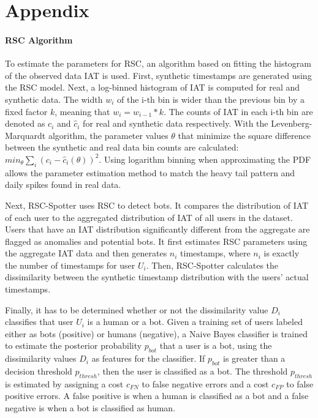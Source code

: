 \documentclass[11pt, oneside]{article}   	%
\begin{document}
\section{Appendix}
\paragraph*{RSC Algorithm}
\quad

\quad To estimate the parameters for RSC, an algorithm based on fitting the histogram of the observed data IAT is used.
First, synthetic timestamps are generated using the RSC model.
Next, a log-binned histogram of IAT is computed for real and synthetic data.
The width $w_i$ of the i-th bin is wider than the previous bin by a fixed factor $k$, meaning that $w_i=w_{i-1}*k$.
The counts of IAT in each i-th bin are denoted as $c_i$ and $\hat{c}_i$ for real and synthetic data respectively.
With the Levenberg-Marquardt algorithm, the parameter values $\theta$ that minimize the square difference between the synthetic and real data bin counts are calculated: $min_{\theta} \sum_i (c_i - \hat{c}_i(\theta))^2$.
Using logarithm binning when approximating the PDF allows the parameter estimation method to match the heavy tail pattern and daily spikes found in real data.

\quad Next, RSC-Spotter uses RSC to detect bots.
It compares the distribution of IAT of each user to the aggregated distribution of IAT of all users in the dataset.
Users that have an IAT distribution significantly different from the aggregate are flagged as anomalies and potential bots.
It first estimates RSC parameters using the aggregate IAT data and then generates $n_i$ timestamps, where $n_i$ is exactly the number of timestamps for user $U_i$.
Then, RSC-Spotter calculates the dissimilarity between the synthetic timestamp distribution with the users' actual timestamps.

\quad Finally, it has to be determined whether or not the dissimilarity value $D_i$ classifies that user $U_i$ is a human or a bot.
Given a training set of users labeled either as bots (positive) or humans (negative), a Naive Bayes classifier is trained to estimate the posterior probability $p_{bot}$ that a user is a bot, using the dissimilarity values $D_i$ as features for the classifier.
If $p_{bot}$ is greater than a decision threshold $p_{thresh}$, then the user is classified as a bot.
The threshold $p_{thresh}$ is estimated by assigning a cost $c_{FN}$ to false negative errors and a cost $c_{FP}$ to false positive errors.
A false positive is when a human is classified as a bot and a false negative is when a bot is classified as human.
\end{document}
